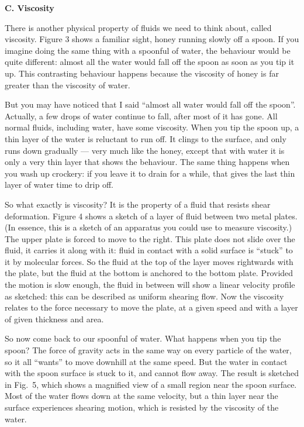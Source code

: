   \textbf{C. Viscosity} 

  There is another physical property of fluids we need to think about, called 
  viscosity. Figure 3 shows a familiar sight, honey running slowly off a spoon. 
  If you imagine doing the same thing with a spoonful of water, the behaviour 
  would be quite different: almost all the water would fall off the spoon as 
  soon as you tip it up. This contrasting behaviour happens because the 
  viscosity of honey is far greater than the viscosity of water. 


  But you may have noticed that I said “almost all water would fall off the 
  spoon”. Actually, a few drops of water continue to fall, after most of it has 
  gone. All normal fluids, including water, have some viscosity. When you tip 
  the spoon up, a thin layer of the water is reluctant to run off. It clings to 
  the surface, and only runs down gradually — very much like the honey, except 
  that with water it is only a very thin layer that shows the behaviour. The 
  same thing happens when you wash up crockery: if you leave it to drain for a 
  while, that gives the last thin layer of water time to drip off. 

  So what exactly is viscosity? It is the property of a fluid that resists 
  shear deformation. Figure 4 shows a sketch of a layer of fluid between two 
  metal plates. (In essence, this is a sketch of an apparatus you could use to 
  measure viscosity.) The upper plate is forced to move to the right. This 
  plate does not slide over the fluid, it carries it along with it: fluid in 
  contact with a solid surface is “stuck” to it by molecular forces. So the 
  fluid at the top of the layer moves rightwards with the plate, but the fluid 
  at the bottom is anchored to the bottom plate. Provided the motion is slow 
  enough, the fluid in between will show a linear velocity profile as sketched: 
  this can be described as uniform shearing flow. Now the viscosity relates to 
  the force necessary to move the plate, at a given speed and with a layer of 
  given thickness and area. 


  So now come back to our spoonful of water. What happens when you tip the 
  spoon? The force of gravity acts in the same way on every particle of the 
  water, so it all “wants” to move downhill at the same speed. But the water in 
  contact with the spoon surface is stuck to it, and cannot flow away. The 
  result is sketched in Fig.\ 5, which shows a magnified view of a small region 
  near the spoon surface. Most of the water flows down at the same velocity, 
  but a thin layer near the surface experiences shearing motion, which is 
  resisted by the viscosity of the water. 

